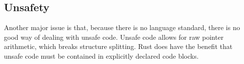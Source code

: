 \documentclass[12pt,final]{article}
\newcommand{\mirname}{{\texttt{MIR}}}
\def \mir {\mirname{}\xspace}
\begin{document}
\subsection{Unsafety}
\label{sec:unsafe}


Another major issue is that, because there is no language standard, there is no
good way of dealing with unsafe code. Unsafe code allows for raw pointer
arithmetic, which breaks structure splitting. Rust does have the benefit that
unsafe code must be contained in explicitly declared code blocks.








\end{document}

